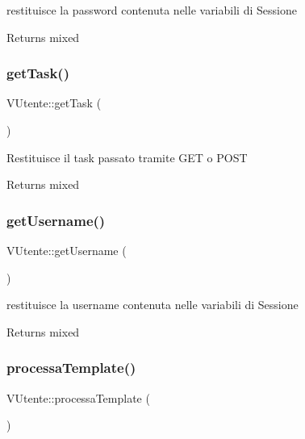 restituisce la password contenuta nelle variabili di Sessione

\begin{DoxyReturn}{Returns}
mixed 
\end{DoxyReturn}
\mbox{\label{class_v_utente_a14be18c29e1d3bed4ac995207515fb8f}} 
\subsubsection{\texorpdfstring{get\+Task()}{getTask()}}
{\footnotesize\ttfamily V\+Utente\+::get\+Task (\begin{DoxyParamCaption}{ }\end{DoxyParamCaption})}

Restituisce il task passato tramite G\+ET o P\+O\+ST

\begin{DoxyReturn}{Returns}
mixed 
\end{DoxyReturn}
\mbox{\label{class_v_utente_a115864c6bb5d14f4a2d217393e181cd9}} 
\subsubsection{\texorpdfstring{get\+Username()}{getUsername()}}
{\footnotesize\ttfamily V\+Utente\+::get\+Username (\begin{DoxyParamCaption}{ }\end{DoxyParamCaption})}

restituisce la username contenuta nelle variabili di Sessione

\begin{DoxyReturn}{Returns}
mixed 
\end{DoxyReturn}
\mbox{\label{class_v_utente_a76ea328ab7d219856682ff832b9419e0}} 
\subsubsection{\texorpdfstring{processa\+Template()}{processaTemplate()}}
{\footnotesize\ttfamily V\+Utente\+::processa\+Template (\begin{DoxyParamCaption}{ }\end{DoxyParamCaption})}

